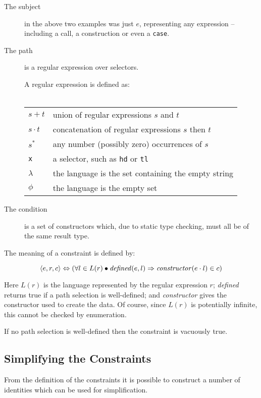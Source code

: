 \documentclass[book]{tfp05symp}
\newcommand{\T}[1]{\texttt{#1}}
\newcommand{\tup}[1]{\ensuremath{\langle #1 \rangle}}
\newcommand{\K}{\ensuremath{^\ast}}
\newcommand{\D}{\ensuremath{\cdot}}
\begin{document}
\begin{description}
\item[The subject] in the above two examples was just $e$,
representing any expression -- including a call, a construction or
even a \T{case}.

\item[The path] is a regular expression over selectors.

A regular expression is defined as:\\ \\
\begin{tabular}{ll}
$s+t$ & union of regular expressions $s$ and $t$ \\
$s\D t$ & concatenation of regular expressions $s$ then $t$ \\
$s\K$  & any number (possibly zero) occurrences of $s$ \\
\T{x} & a selector, such as \T{hd} or \T{tl} \\
$\lambda$ & the language is the set containing the empty string \\
$\phi$ & the language is the empty set
\end{tabular}

\item[The condition] is a set of constructors which, due to static type
checking, must all be of the same result type.
\end{description}

The meaning of a constraint is defined by:

\[ \tup{e,r,c} \Leftrightarrow (\forall l \in L(r) \bullet
\text{\textit{defined}}(e,l) \Rightarrow
\text{\textit{constructor}}(e\D{}l) \in c )
\]

\noindent Here $L(r)$ is the language represented by the regular
expression $r$; \textit{defined} returns true if a path selection is
well-defined; and \textit{constructor} gives the constructor used to
create the data. Of course, since $L(r)$ is potentially infinite,
this cannot be checked by enumeration.

If no path selection is well-defined then the constraint is
vacuously true.

\subsection{Simplifying the Constraints}
\label{sec:constraint_simplify}

From the definition of the constraints it is possible to construct a
number of identities which can be used for simplification.
\end{document}
